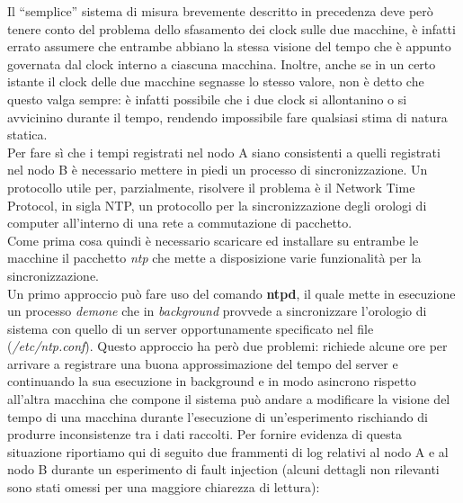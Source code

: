 Il ``semplice'' sistema di misura brevemente descritto in precedenza deve però tenere conto del problema dello sfasamento dei clock sulle due macchine, è infatti errato assumere che entrambe abbiano la stessa visione del tempo che è appunto governata dal clock interno a ciascuna macchina. Inoltre, anche se in un certo istante il clock delle due macchine segnasse lo stesso valore, non è detto che questo valga sempre: è infatti possibile che i due clock si allontanino o si avvicinino durante il tempo, rendendo impossibile fare qualsiasi stima di natura statica.\\
Per fare sì che i tempi registrati nel nodo A siano consistenti a quelli registrati nel nodo B è necessario mettere in piedi un processo di sincronizzazione. Un protocollo utile per, parzialmente, risolvere il problema è il Network Time Protocol, in sigla NTP, un protocollo per la sincronizzazione degli orologi di computer all'interno di una rete a commutazione di pacchetto.\\
Come prima cosa quindi è necessario scaricare ed installare su entrambe le macchine il pacchetto \textit{ntp} che mette a disposizione varie funzionalità per la sincronizzazione.\\
Un primo approccio può fare uso del comando \textbf{ntpd}, il quale mette in esecuzione un processo \textit{demone} che in \textit{background} provvede a sincronizzare l'orologio di sistema con quello di un server opportunamente specificato nel file (\textit{/etc/ntp.conf}). Questo approccio ha però due problemi: richiede alcune ore per arrivare a registrare una buona approssimazione del tempo del server e continuando la sua esecuzione in background e in modo asincrono rispetto all'altra macchina che compone il sistema può andare a modificare la visione del tempo di una macchina durante l'esecuzione di un'esperimento rischiando di produrre inconsistenze tra i dati raccolti.
Per fornire evidenza di questa situazione riportiamo qui di seguito due frammenti di log relativi al nodo A e al nodo B durante un esperimento di fault injection (alcuni dettagli non rilevanti sono stati omessi per una maggiore chiarezza di lettura):

